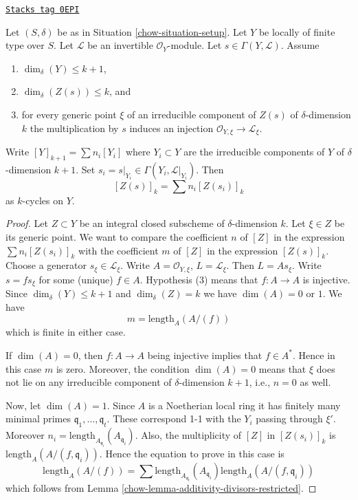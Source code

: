 \begin{lemma}
\label{chow-lemma-prepare-geometric-cap}
\href{https://stacks.math.columbia.edu/tag/0EPI}{\texttt{Stacks tag 0EPI}}

Let $(S, \delta)$ be as in Situation \ref{chow-situation-setup}.
Let $Y$ be locally of finite type over $S$.
Let $\mathcal{L}$ be an invertible $\mathcal{O}_Y$-module.
Let $s \in \Gamma(Y, \mathcal{L})$.
Assume
\begin{enumerate}
\item $\dim_\delta(Y) \leq k + 1$,
\item $\dim_\delta(Z(s)) \leq k$, and
\item for every generic point $\xi$ of an irreducible component of
$Z(s)$ of $\delta$-dimension $k$ the multiplication by $s$
induces an injection $\mathcal{O}_{Y, \xi} \to \mathcal{L}_\xi$.
\end{enumerate}
Write $[Y]_{k + 1} = \sum n_i[Y_i]$ where $Y_i \subset Y$ are the
irreducible components of $Y$ of $\delta$-dimension $k + 1$.
Set $s_i = s|_{Y_i} \in \Gamma(Y_i, \mathcal{L}|_{Y_i})$. Then
\begin{equation}
\label{equation-equal-as-cycles}
[Z(s)]_k =  \sum n_i[Z(s_i)]_k
\end{equation}
as $k$-cycles on $Y$.
\end{lemma}

\begin{proof}

Let $Z \subset Y$ be an integral closed subscheme of
$\delta$-dimension $k$. Let $\xi \in Z$ be its generic point.
We want to compare the coefficient $n$ of $[Z]$ in the expression
$\sum n_i[Z(s_i)]_k$ with the coefficient $m$ of $[Z]$ in the
expression $[Z(s)]_k$. Choose a generator $s_\xi \in \mathcal{L}_\xi$.
Write $A = \mathcal{O}_{Y, \xi}$, $L = \mathcal{L}_\xi$.
Then $L = As_\xi$. Write $s = f s_\xi$ for some (unique) $f \in A$.
Hypothesis (3) means that $f : A \to A$ is injective.
Since $\dim_\delta(Y) \leq k + 1$ and $\dim_\delta(Z) = k$
we have $\dim(A) = 0$ or $1$. We have
$$
m = \text{length}_A(A/(f))
$$
which is finite in either case.

\medskip\noindent
If $\dim(A) = 0$, then $f : A \to A$ being injective
implies that $f \in A^*$. Hence in this case $m$ is zero.
Moreover, the condition $\dim(A) = 0$ means that $\xi$
does not lie on any irreducible component of $\delta$-dimension
$k + 1$, i.e., $n = 0$ as well.

\medskip\noindent
Now, let $\dim(A) = 1$.
Since $A$ is a Noetherian local ring it has finitely
many minimal primes $\mathfrak q_1, \ldots, \mathfrak q_t$.
These correspond 1-1 with the $Y_i$ passing through $\xi'$.
Moreover $n_i = \text{length}_{A_{\mathfrak q_i}}(A_{\mathfrak q_i})$.
Also, the multiplicity of $[Z]$ in $[Z(s_i)]_k$ is
$\text{length}_A(A/(f, \mathfrak q_i))$.
Hence the equation to prove in this case is
$$
\text{length}_A(A/(f))
=
\sum \text{length}_{A_{\mathfrak q_i}}(A_{\mathfrak q_i})
\text{length}_A(A/(f, \mathfrak q_i))
$$
which follows from
Lemma \ref{chow-lemma-additivity-divisors-restricted}.
\end{proof}

